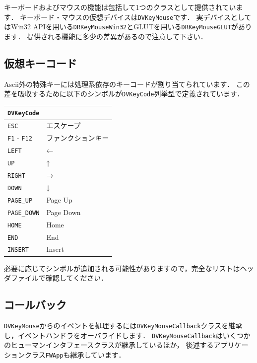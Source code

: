 \KLUDGE キーボードおよびマウスの機能は包括して1つのクラスとして提供されています．
\KLUDGE キーボード・マウスの仮想デバイスは\texttt{DVKeyMouse}です．
\KLUDGE 実デバイスとしてはWin32 APIを用いる\texttt{DRKeyMouseWin32}とGLUTを用いる\texttt{DRKeyMouseGLUT}があります．
\KLUDGE 提供される機能に多少の差異があるので注意して下さい．

\subsection*{仮想キーコード}

Ascii外の特殊キーには処理系依存のキーコードが割り当てられています．
\KLUDGE この差を吸収するために以下のシンボルが\texttt{DVKeyCode}列挙型で定義されています．

\begin{center}
\begin{tabular}{p{.3\hsize}p{.6\hsize}}
\texttt{DVKeyCode}									\\ \midrule
\texttt{ESC}				& エスケープ			\\
\texttt{F1} - \texttt{F12}	& ファンクションキー	\\
\texttt{LEFT}				& ←					\\
\texttt{UP}					& ↑					\\
\texttt{RIGHT}				& →					\\
\texttt{DOWN}				& ↓					\\
\texttt{PAGE\_UP}			& Page Up				\\
\texttt{PAGE\_DOWN}			& Page Down				\\
\texttt{HOME}				& Home					\\
\texttt{END}				& End					\\
\texttt{INSERT}				& Insert				\\
\end{tabular}
\end{center}

\KLUDGE 必要に応じてシンボルが追加される可能性がありますので，完全なリストはヘッダファイルで確認してください．

\subsection*{コールバック}

\texttt{DVKeyMouse}からのイベントを処理するには\texttt{DVKeyMouseCallback}クラスを継承し，イベントハンドラをオーバライドします．
\texttt{DVKeyMouseCallback}はいくつかのヒューマンインタフェースクラスが継承しているほか，
\KLUDGE 後述するアプリケーションクラス\texttt{FWApp}も継承しています．

